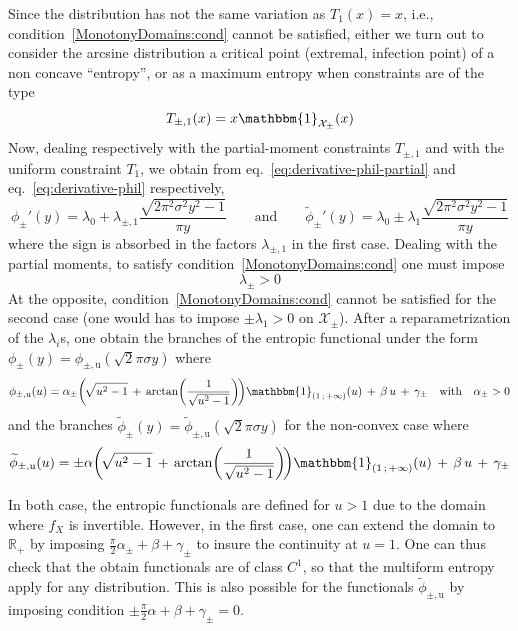 \documentclass[entropy,article,submit,moreauthors,pdftex]{Definitions/mdpi}
\newcommand{\SZ}[1]{{\color{blue} #1}}                                       %
\def\Rset{\mathbb{R}}%
\def\X{\mathcal{X}}%
\def\un{\mathbbm{1}}%
\begin{document}
\SZ{Since the  distribution has not  the same variation  as $T_1(x) =  x$, i.e.,
  condition~\ref{MonotonyDomains:cond} cannot  be satisfied, either we  turn out
  to consider  the arcsine  distribution a  critical point  (extremal, infection
  point) of a non concave ``entropy'',  or as a maximum entropy when constraints
  are of the type
%
\[
T_{\pm,1}(x) = x \un_{\X_\pm}(x)
\]
%
Now, dealing  respectively with  the partial-moment constraints  $T_{\pm,1}$ and
with     the      uniform     constraint      $T_1$,     we      obtain     from
eq.~\eqref{eq:derivative-phil-partial}     and    eq.~\eqref{eq:derivative-phil}
respectively,
%
\[
\phi_\pm'(y) =  \lambda_0 + \lambda_{\pm,1}  \frac{\sqrt{2 \pi^2 \sigma^2  y^2 -
    1}}{\pi y} \qquad \mbox{and} \qquad \widetilde{\phi}_\pm'(y) = \lambda_0 \pm
\lambda_1 \frac{\sqrt{2 \pi^2 \sigma^2 y^2 - 1}}{\pi y}
\]
%
where the sign  is absorbed in the factors $\lambda_{\pm,1}$  in the first case.
Dealing       with       the       partial       moments,       to       satisfy
condition~\ref{MonotonyDomains:cond} one must impose  $$\lambda_\pm > 0$$ At the
opposite,  condition~\ref{MonotonyDomains:cond}  cannot  be  satisfied  for  the
second case (one would  has to impose $\pm \lambda_1 > 0$  on $\X_\pm$). After a
reparametrization of the  $\lambda_i$s, one obtain the branches  of the entropic
functional under the form $\phi_\pm(y) = \phi_{\pm,\mathrm{u}}(\sqrt2 \pi \sigma
y)$ where
%
\[
\phi_{\pm,\mathrm{u}}(u)  =  \alpha_\pm  \left(  \!  \sqrt{u^2  -  1}  \,  +  \,
\arctan\left( \frac{1}{\sqrt{u^2 - 1}} \right) \!  \right) \un_{\left( 1 \, ; \,
  +\infty \right)}(u) \,  + \, \beta \,  u \, + \,  \gamma_\pm \quad \mbox{with}
\quad \alpha_\pm > 0
\]
%
and          the           branches          $\widetilde{\phi}_\pm(y)          =
\widetilde{\phi}_{\pm,\mathrm{u}}(\sqrt2 \pi \sigma y)$  for the non-convex case
where
%
\[
\widetilde{\phi}_{\pm,\mathrm{u}}(u) = \pm \alpha \left(  \! \sqrt{u^2 - 1} \, +
\, \arctan\left( \frac{1}{\sqrt{u^2 - 1}} \right)  \! \right) \un_{\left( 1 \, ;
  \, +\infty \right)}(u) \, + \, \beta \, u \, + \, \gamma_\pm
\]

In both case, the entropic functionals are defined for $u > 1$ due to the domain
where $f_X$ is invertible. However, in the first case, one can extend the domain
to  $\Rset_+$ by  imposing $\frac{\pi}{2}  \alpha_\pm +  \beta +  \gamma_\pm$ to
insure  the  continuity  at $u  =  1$.   One  can  thus check  that  the  obtain
functionals are  of class  $C^1$, so  that the multiform  entropy apply  for any
distribution.     This     is    also     possible    for     the    functionals
$\widetilde{\phi}_{\pm,\mathrm{u}}$  by  imposing condition  $\pm  \frac{\pi}{2}
\alpha + \beta + \gamma_\pm = 0$.

}
\end{document}
